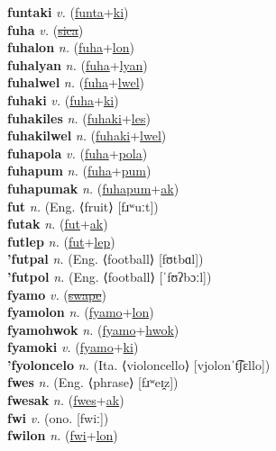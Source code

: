 \textbf{funtaki} \textit{v.} (\hyperref[funta]{funta}+\hyperref[ki]{ki})
 \label{funtaki} \\
\textbf{fuha} \textit{v.} (\hyperref[sica]{\sout{sica}})
 \label{fuha} \\
\textbf{fuhalon} \textit{n.} (\hyperref[fuha]{fuha}+\hyperref[lon]{lon})
 \label{fuhalon} \\
\textbf{fuhalyan} \textit{n.} (\hyperref[fuha]{fuha}+\hyperref[lyan]{lyan})
 \label{fuhalyan} \\
\textbf{fuhalwel} \textit{n.} (\hyperref[fuha]{fuha}+\hyperref[lwel]{lwel})
 \label{fuhalwel} \\
\textbf{fuhaki} \textit{v.} (\hyperref[fuha]{fuha}+\hyperref[ki]{ki})
 \label{fuhaki} \\
\textbf{fuhakiles} \textit{n.} (\hyperref[fuhaki]{fuhaki}+\hyperref[les]{les})
 \label{fuhakiles} \\
\textbf{fuhakilwel} \textit{n.} (\hyperref[fuhaki]{fuhaki}+\hyperref[lwel]{lwel})
 \label{fuhakilwel} \\
\textbf{fuhapola} \textit{v.} (\hyperref[fuha]{fuha}+\hyperref[pola]{pola})
 \label{fuhapola} \\
\textbf{fuhapum} \textit{n.} (\hyperref[fuha]{fuha}+\hyperref[pum]{pum})
 \label{fuhapum} \\
\textbf{fuhapumak} \textit{n.} (\hyperref[fuhapum]{fuhapum}+\hyperref[ak]{ak})
 \label{fuhapumak} \\
\textbf{fut} \textit{n.} (Eng. ⟨fruit⟩ [fɹʷuːt])
 \label{fut} \\
\textbf{futak} \textit{n.} (\hyperref[fut]{fut}+\hyperref[ak]{ak})
 \label{futak} \\
\textbf{futlep} \textit{n.} (\hyperref[fut]{fut}+\hyperref[lep]{lep})
 \label{futlep} \\
\textbf{'futpal} \textit{n.} (Eng. ⟨football⟩ [fʊtbɑl])
 \label{'futpal} \\
\textbf{'futpol} \textit{n.} (Eng. ⟨football⟩ [ˈfʊʔbɔːl])
 \label{'futpol} \\
\textbf{fyamo} \textit{v.} (\hyperref[swape]{\sout{swape}})
 \label{fyamo} \\
\textbf{fyamolon} \textit{n.} (\hyperref[fyamo]{fyamo}+\hyperref[lon]{lon})
 \label{fyamolon} \\
\textbf{fyamohwok} \textit{n.} (\hyperref[fyamo]{fyamo}+\hyperref[hwok]{hwok})
 \label{fyamohwok} \\
\textbf{fyamoki} \textit{v.} (\hyperref[fyamo]{fyamo}+\hyperref[ki]{ki})
 \label{fyamoki} \\
\textbf{'fyoloncelo} \textit{n.} (Ita. ⟨violoncello⟩ [vjolonˈt͡ʃɛllo])
 \label{'fyoloncelo} \\
\textbf{fwes} \textit{n.} (Eng. ⟨phrase⟩ [fɹʷeɪ̯z])
 \label{fwes} \\
\textbf{fwesak} \textit{n.} (\hyperref[fwes]{fwes}+\hyperref[ak]{ak})
 \label{fwesak} \\
\textbf{fwi} \textit{v.} (ono. [fwiː])
 \label{fwi} \\
\textbf{fwilon} \textit{n.} (\hyperref[fwi]{fwi}+\hyperref[lon]{lon})
 \label{fwilon} 

